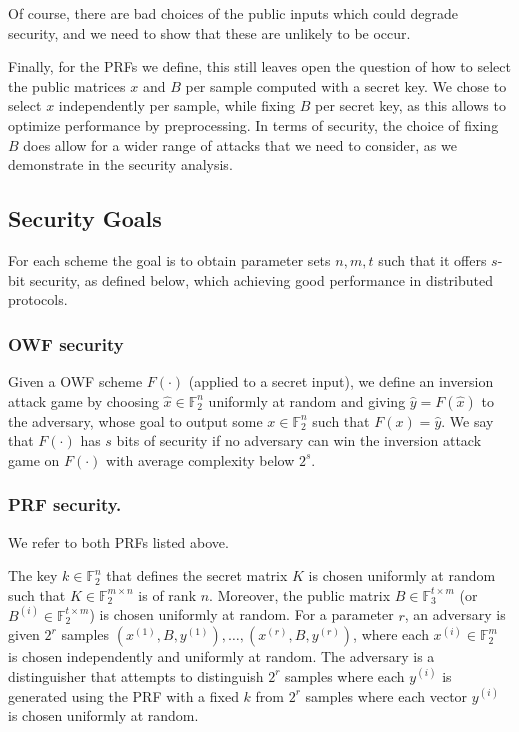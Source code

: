 \documentclass[orivec,envcountsect]{llncs}
\begin{document}
Of course, there are bad choices of the public inputs which could degrade security,
and we need to show that these are unlikely to be occur.

Finally, for the PRFs we define, this still leaves open the question of how to select the public matrices $x$ and $B$
per sample computed with a secret key. We chose to select $x$ independently per sample,
while fixing $B$ per secret key, as this allows to optimize performance by preprocessing.  
In terms of security, the choice of fixing $B$ does allow for a wider range of attacks
that we need to consider, as we demonstrate in the security analysis.


\subsection{Security Goals}
For each scheme the goal is to obtain parameter sets $n,m,t$ such that it offers
$s$-bit security, as defined below, which achieving good performance in distributed protocols.

\subsubsection{OWF security}

Given a OWF scheme $F(\cdot)$ (applied to a secret input), we define an inversion attack game by choosing $\hat{x} \in \mathbb{F}_2^n$
uniformly at random and giving $\hat{y}= F(\hat{x})$ to the adversary, whose
goal to output some $x \in \mathbb{F}_2^n$ such that $F(x) = \hat{y}$.
We say that $F(\cdot)$ has $s$ bits of security if no adversary can win the inversion attack game on $F(\cdot)$ with average complexity below $2^s$.


\subsubsection{PRF security.}

We refer to both PRFs listed above.

The key $k \in \mathbb{F}_2^n$ that defines the secret matrix $K$ is chosen uniformly at random such that
$K \in \mathbb{F}_2^{m \times n}$ is of rank $n$.
Moreover, the public matrix
$B \in \mathbb{F}_3^{t \times m}$ (or $B^{(i)} \in \mathbb{F}_2^{t \times m}$) is chosen uniformly at random.  
For a parameter $r$, an adversary is given $2^{r}$ samples $(x^{(1)},B,y^{(1)}) ,\ldots, (x^{(r)},B,y^{(r)})$,
where each $x^{(i)} \in \mathbb{F}_2^m$ is chosen independently and uniformly at random.
The adversary is a distinguisher that attempts to distinguish $2^r$ samples where each $y^{(i)}$
is generated using the PRF with a fixed $k$ from
$2^r$ samples where each vector $y^{(i)}$ is chosen uniformly at random.
\end{document}
